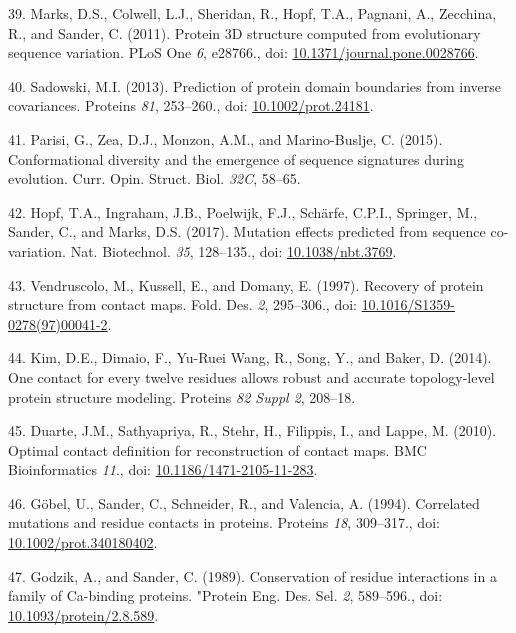 \documentclass[11pt,a4paper,twoside]{book}
\theoremstyle{definition}
\theoremstyle{definition}
\theoremstyle{remark}
\begin{document}
\hypertarget{ref-Marks2011}{}
39. Marks, D.S., Colwell, L.J., Sheridan, R., Hopf, T.A., Pagnani, A.,
Zecchina, R., and Sander, C. (2011). Protein 3D structure computed from
evolutionary sequence variation. PLoS One \emph{6}, e28766., doi:
\href{https://doi.org/10.1371/journal.pone.0028766}{10.1371/journal.pone.0028766}.

\hypertarget{ref-Sadowski2013}{}
40. Sadowski, M.I. (2013). Prediction of protein domain boundaries from
inverse covariances. Proteins \emph{81}, 253--260., doi:
\href{https://doi.org/10.1002/prot.24181}{10.1002/prot.24181}.

\hypertarget{ref-Parisi2015a}{}
41. Parisi, G., Zea, D.J., Monzon, A.M., and Marino-Buslje, C. (2015).
Conformational diversity and the emergence of sequence signatures during
evolution. Curr. Opin. Struct. Biol. \emph{32C}, 58--65.

\hypertarget{ref-Hopf2017}{}
42. Hopf, T.A., Ingraham, J.B., Poelwijk, F.J., Schärfe, C.P.I.,
Springer, M., Sander, C., and Marks, D.S. (2017). Mutation effects
predicted from sequence co-variation. Nat. Biotechnol. \emph{35},
128--135., doi:
\href{https://doi.org/10.1038/nbt.3769}{10.1038/nbt.3769}.

\hypertarget{ref-Vendruscolo1997}{}
43. Vendruscolo, M., Kussell, E., and Domany, E. (1997). Recovery of
protein structure from contact maps. Fold. Des. \emph{2}, 295--306.,
doi:
\href{https://doi.org/10.1016/S1359-0278(97)00041-2}{10.1016/S1359-0278(97)00041-2}.

\hypertarget{ref-Kim2014}{}
44. Kim, D.E., Dimaio, F., Yu-Ruei Wang, R., Song, Y., and Baker, D.
(2014). One contact for every twelve residues allows robust and accurate
topology-level protein structure modeling. Proteins \emph{82 Suppl 2},
208--18.

\hypertarget{ref-Duarte2010}{}
45. Duarte, J.M., Sathyapriya, R., Stehr, H., Filippis, I., and Lappe,
M. (2010). Optimal contact definition for reconstruction of contact
maps. BMC Bioinformatics \emph{11}., doi:
\href{https://doi.org/10.1186/1471-2105-11-283}{10.1186/1471-2105-11-283}.

\hypertarget{ref-Gobel1994}{}
46. Göbel, U., Sander, C., Schneider, R., and Valencia, A. (1994).
Correlated mutations and residue contacts in proteins. Proteins
\emph{18}, 309--317., doi:
\href{https://doi.org/10.1002/prot.340180402}{10.1002/prot.340180402}.

\hypertarget{ref-Godzik1989}{}
47. Godzik, A., and Sander, C. (1989). Conservation of residue
interactions in a family of Ca-binding proteins. "Protein Eng. Des. Sel.
\emph{2}, 589--596., doi:
\href{https://doi.org/10.1093/protein/2.8.589}{10.1093/protein/2.8.589}.
\end{document}
